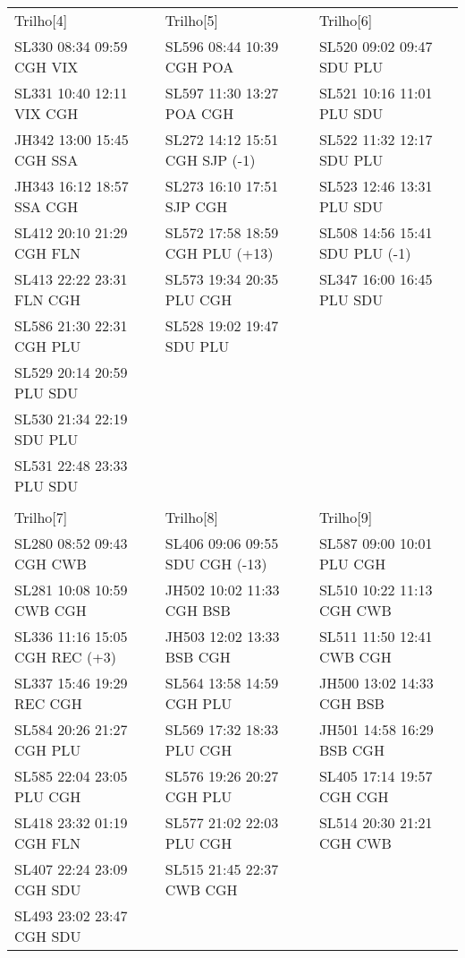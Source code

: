 \documentclass{endm}
\begin{document}
\begin{center}
\begin{longtable}{lll}
\\
\scriptsize Trilho[4] &       \scriptsize Trilho[5] &       \scriptsize Trilho[6] \\
\scriptsize SL330 08:34 09:59 CGH VIX &       \scriptsize SL596 08:44 10:39 CGH POA &       \scriptsize SL520 09:02 09:47 SDU PLU \\
\scriptsize SL331 10:40 12:11 VIX CGH &       \scriptsize SL597 11:30 13:27 POA CGH &       \scriptsize SL521 10:16 11:01 PLU SDU\\
\scriptsize JH342 13:00 15:45 CGH SSA &       \scriptsize SL272 14:12 15:51 CGH SJP (-1) &       \scriptsize SL522 11:32 12:17 SDU PLU\\
\scriptsize JH343 16:12 18:57 SSA CGH &       \scriptsize SL273 16:10 17:51 SJP CGH &       \scriptsize SL523 12:46 13:31 PLU SDU\\
\scriptsize SL412 20:10 21:29 CGH FLN &       \scriptsize SL572 17:58 18:59 CGH PLU (+13) &       \scriptsize SL508 14:56 15:41 SDU PLU (-1)\\
\scriptsize SL413 22:22 23:31 FLN CGH &       \scriptsize SL573 19:34 20:35 PLU CGH &       \scriptsize SL347 16:00 16:45 PLU SDU\\
\scriptsize SL586 21:30 22:31 CGH PLU &       \scriptsize SL528 19:02 19:47 SDU PLU & \\
\scriptsize SL529 20:14 20:59 PLU SDU & & \\
\scriptsize SL530 21:34 22:19 SDU PLU & & \\
\scriptsize SL531 22:48 23:33 PLU SDU & & \\

\\

\scriptsize Trilho[7] &       \scriptsize Trilho[8] &       \scriptsize Trilho[9] \\
\scriptsize SL280 08:52 09:43 CGH CWB &       \scriptsize SL406 09:06 09:55 SDU CGH (-13) &       \scriptsize SL587 09:00 10:01 PLU CGH\\
\scriptsize SL281 10:08 10:59 CWB CGH &       \scriptsize JH502 10:02 11:33 CGH BSB	 &       \scriptsize SL510 10:22 11:13 CGH CWB\\
\scriptsize SL336 11:16 15:05 CGH REC (+3) &       \scriptsize JH503 12:02 13:33 BSB CGH &       \scriptsize SL511 11:50 12:41 CWB CGH\\
\scriptsize SL337 15:46 19:29 REC CGH &       \scriptsize SL564 13:58 14:59 CGH PLU &       \scriptsize JH500 13:02 14:33 CGH BSB\\
\scriptsize SL584 20:26 21:27 CGH PLU &       \scriptsize SL569 17:32 18:33 PLU CGH &       \scriptsize JH501 14:58 16:29 BSB CGH\\
\scriptsize SL585 22:04 23:05 PLU CGH &       \scriptsize SL576 19:26 20:27 CGH PLU &       \scriptsize SL405 17:14 19:57 CGH CGH\\
\scriptsize SL418 23:32 01:19 CGH FLN &       \scriptsize SL577 21:02 22:03 PLU CGH &       \scriptsize SL514 20:30 21:21 CGH CWB \\
\scriptsize SL407 22:24 23:09 CGH SDU &       \scriptsize SL515 21:45 22:37 CWB CGH  &   \\
\scriptsize SL493 23:02 23:47 CGH SDU &   &   \\


\end{longtable}
\end{center}
\end{document}
